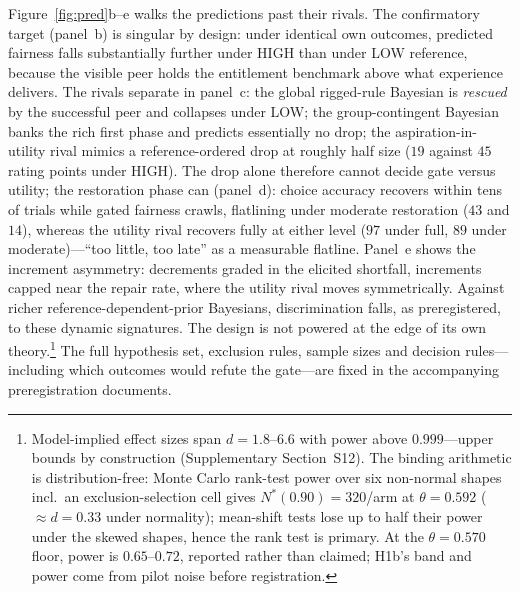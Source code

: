 \documentclass[11pt]{article}
\newcommand{\1}{\mathbf{1}}
\begin{document}
Figure~\ref{fig:pred}b--e walks the predictions past their rivals. The confirmatory target (panel~b) is singular by design: under identical own outcomes, predicted fairness falls substantially further under HIGH than under LOW reference, because the visible peer holds the entitlement benchmark above what experience delivers. The rivals separate in panel~c: the global rigged-rule Bayesian is \emph{rescued} by the successful peer and collapses under LOW; the group-contingent Bayesian banks the rich first phase and predicts essentially no drop; the aspiration-in-utility rival mimics a reference-ordered drop at roughly half size ($19$ against $45$ rating points under HIGH). The drop alone therefore cannot decide gate versus utility; the restoration phase can (panel~d): choice accuracy recovers within tens of trials while gated fairness crawls, flatlining under moderate restoration ($43$ and $14$), whereas the utility rival recovers fully at either level ($97$ under full, $89$ under moderate)---``too little, too late'' as a measurable flatline. Panel~e shows the increment asymmetry: decrements graded in the elicited shortfall, increments capped near the repair rate, where the utility rival moves symmetrically. Against richer reference-dependent-prior Bayesians, discrimination falls, as preregistered, to these dynamic signatures. The design is not powered at the edge of its own theory.\footnote{Model-implied effect sizes span $d=1.8$--$6.6$ with power above $0.999$---upper bounds by construction (Supplementary Section~S12). The binding arithmetic is distribution-free: Monte Carlo rank-test power over six non-normal shapes incl.\ an exclusion-selection cell gives $N^{*}(0.90)=320$/arm at $\theta=0.592$ ($\approx d=0.33$ under normality); mean-shift tests lose up to half their power under the skewed shapes, hence the rank test is primary. At the $\theta=0.570$ floor, power is $0.65$--$0.72$, reported rather than claimed; H1b's band and power come from pilot noise before registration.} The full hypothesis set, exclusion rules, sample sizes and decision rules---including which outcomes would refute the gate---are fixed in the accompanying preregistration documents.
\end{document}
